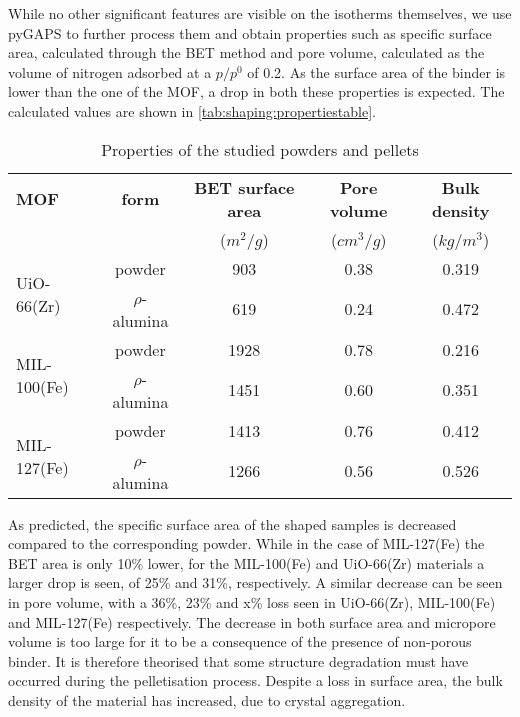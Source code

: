While no other significant features are visible on the isotherms themselves,
we use pyGAPS to further process them and obtain properties
such as specific surface area, calculated through the BET method and pore
volume, calculated as the volume of nitrogen
adsorbed at a \(p/p^0\) of 0.2.
As the surface area of the binder is lower than the
one of the MOF, a drop in both these properties is expected.
The calculated values are shown in
\autoref{tab:shaping:propertiestable}.

\begin{table}[htb]
	\centering
	\caption{Properties of the studied powders and pellets}
	\begin{tabular}{lcccc}
		\toprule
		\textbf{MOF}
		                             & \textbf{form}
		                             & \textbf{BET surface area}
		                             & \textbf{Pore volume}
		                             & \textbf{Bulk density}                                                 \\
		                             &                           & (\(m^2/g\)) & (\(cm^3/g\)) & (\(kg/m^3\)) \\
		\midrule
		\multirow{2}{*}{UiO-66(Zr)}  & powder                    & 903         & 0.38         & 0.319        \\
		                             & \(\rho\)-alumina          & 619         & 0.24         & 0.472        \\
		\multirow{2}{*}{MIL-100(Fe)} & powder                    & 1928        & 0.78         & 0.216        \\
		                             & \(\rho\)-alumina          & 1451        & 0.60         & 0.351        \\
		\multirow{2}{*}{MIL-127(Fe)} & powder                    & 1413        & 0.76         & 0.412        \\
		                             & \(\rho\)-alumina          & 1266        & 0.56         & 0.526        \\
		\bottomrule
	\end{tabular}%
	\label{tab:shaping:propertiestable}
\end{table}%

As predicted, the specific surface area of the shaped samples is
decreased compared to the corresponding powder. While in the case
of MIL-127(Fe) the BET area is only 10\% lower, for the MIL-100(Fe)
and UiO-66(Zr) materials a larger drop is seen, of 25\% and 31\%,
respectively.
A similar decrease can be seen in pore volume,
with a 36\%, 23\% and x\% loss seen
in UiO-66(Zr), MIL-100(Fe) and MIL-127(Fe) respectively.
The decrease in both surface area and micropore volume is
too large for it to be a consequence of the presence of non-porous binder.
It is therefore theorised that some structure degradation must have
occurred during the pelletisation process.
Despite a loss in surface area, the bulk density of the material
has increased, due to crystal aggregation.